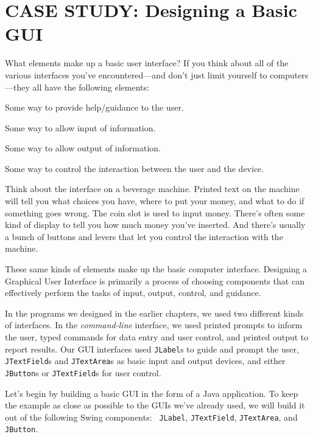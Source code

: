 \section{CASE STUDY: Designing a Basic GUI}
\noindent What elements make up a basic user interface?  If you think about all
of the various interfaces you've encountered---and don't just limit
yourself to computers---they all have the following elements:

\begin{BL}
\item  Some way to provide help/guidance to the user.
\item  Some way to allow input of information.
\item  Some way to allow output of information.
\item  Some way to control the interaction between the user and the device.
\end{BL}

\noindent Think about the interface on a beverage machine.
Printed text on the machine will tell you what choices you have, where
to put your money, and what to do if something goes wrong.   The coin
slot is used to input money.  There's often some kind of display to
tell you how much money you've inserted.  And there's usually a bunch
of buttons and levers that let you control the interaction with the
machine.

These same kinds of elements make up the basic computer interface.
Designing a Graphical User Interface is primarily a process of
choosing components that can effectively perform the tasks of input,
output, control, and guidance.


In the programs we designed in the earlier chapters, we used two
different kinds of interfaces.  In the {\it command-line} interface, we
used printed prompts to inform the user, typed commands for data
entry and user control, and printed output to report results.  Our
GUI interfaces used {\tt JLabel}s to guide and prompt the user,
{\tt JTextField}s and {\tt JTextArea}s as basic input and output devices, and
either {\tt JButton}s or {\tt JTextField}s for user control.

Let's begin by building a basic GUI in the form of a Java application.
To keep the example as close as possible to the GUIs we've already
used, we will build it out of the following Swing components: {\tt
JLabel}, {\tt JTextField}, {\tt JTextArea}, and {\tt JButton}.

